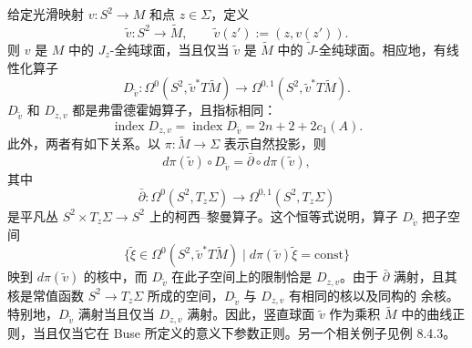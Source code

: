 \begin{remark}\label{rem:6-7-8}
给定光滑映射 $v:S^2\to M$ 和点 $z\in\Sigma$，定义
\[
  \widetilde v:S^2\longrightarrow\widetilde M,
  \qquad \widetilde v(z'):=(z,v(z')).
\]
则 $v$ 是 $M$ 中的 $J_z$-全纯球面，当且仅当 $\widetilde v$ 是 $\widetilde M$ 中的
$\widetilde J$-全纯球面。相应地，有线性化算子
\[
  D_{\widetilde v}:\Omega^0(S^2,\widetilde v^*T\widetilde M)
  \longrightarrow\Omega^{0,1}(S^2,\widetilde v^*T\widetilde M).
\]
$D_{\widetilde v}$ 和 $D_{z,v}$ 都是弗雷德霍姆算子，且指标相同：
\[
  \operatorname{index}D_{z,v}
  =\operatorname{index}D_{\widetilde v}
  =2n+2+2c_1(A).
\]
此外，两者有如下关系。以 $\pi:\widetilde M\to\Sigma$ 表示自然投影，则
\[
  d\pi(\widetilde v)\circ D_{\widetilde v}
  =\bar\partial\circ d\pi(\widetilde v),
\]
其中
\[
  \bar\partial:\Omega^0(S^2,T_z\Sigma)
  \longrightarrow\Omega^{0,1}(S^2,T_z\Sigma)
\]
是平凡丛 $S^2\times T_z\Sigma\to S^2$ 上的柯西--黎曼算子。这个恒等式说明，算子
$D_{\widetilde v}$ 把子空间
\[
  \bigl\{\widetilde\xi\in\Omega^0(S^2,\widetilde v^*T\widetilde M)
    \mid d\pi(\widetilde v)\widetilde\xi=\mathrm{const}\bigr\}
\]
映到 $d\pi(\widetilde v)$ 的核中，而 $D_{\widetilde v}$ 在此子空间上的限制恰是
$D_{z,v}$。由于 $\bar\partial$ 满射，且其核是常值函数
$S^2\to T_z\Sigma$ 所成的空间，$D_{\widetilde v}$ 与 $D_{z,v}$ 有相同的核以及同构的
余核。特别地，$D_{\widetilde v}$ 满射当且仅当 $D_{z,v}$ 满射。因此，竖直球面
$\widetilde v$ 作为乘积 $\widetilde M$ 中的曲线正则，当且仅当它在 Buse
 所定义的意义下参数正则。另一个相关例子见例 8.4.3。
\end{remark}

